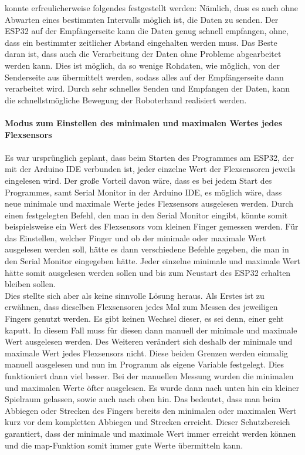 \documentclass[titlepage,12pt,twoside]{article}
\begin{document}
konnte erfreulicherweise folgendes festgestellt werden: Nämlich, dass es auch ohne 
Abwarten eines bestimmten Intervalls möglich ist, die Daten zu senden. Der ESP32 auf 
der Empfängerseite kann die Daten genug schnell empfangen, ohne, dass ein bestimmter 
zeitlicher Abstand eingehalten werden muss. Das Beste daran ist, dass auch die 
Verarbeitung der Daten ohne Probleme abgearbeitet werden kann. Dies ist möglich, da 
so wenige Rohdaten, wie möglich, von der Senderseite aus übermittelt werden, sodass 
alles auf der Empfängerseite dann verarbeitet wird. Durch sehr schnelles Senden und 
Empfangen der Daten, kann die schnellstmögliche Bewegung der Roboterhand realisiert werden. \\
\\
\textbf{Modus zum Einstellen des minimalen und maximalen Wertes jedes Flexsensors} \\
\\
Es war ursprünglich geplant, dass beim Starten des Programmes am ESP32, der mit der 
Arduino IDE verbunden ist, jeder einzelne Wert der Flexsensoren jeweils eingelesen 
wird. Der große Vorteil davon wäre, dass es bei jedem Start des Programmes, samt 
Serial Monitor in der Arduino IDE, es möglich wäre, dass neue minimale und maximale 
Werte jedes Flexsensors ausgelesen werden. Durch einen festgelegten Befehl, den man 
in den Serial Monitor eingibt, könnte somit beispielsweise ein Wert des Flexsensors 
vom kleinen Finger gemessen werden. Für das Einstellen, welcher Finger und ob der 
minimale oder maximale Wert ausgelesen werden soll, hätte es dann verschiedene 
Befehle gegeben, die man in den Serial Monitor eingegeben hätte. Jeder einzelne 
minimale und maximale Wert hätte somit ausgelesen werden sollen und bis zum Neustart 
des ESP32 erhalten bleiben sollen. \\
Dies stellte sich aber als keine sinnvolle Lösung heraus. Als Erstes ist zu erwähnen, 
dass dieselben Flexsensoren jedes Mal zum Messen des jeweiligen Fingers genutzt 
werden. Es gibt keinen Wechsel dieser, es sei denn, einer geht kaputt. In diesem 
Fall muss für diesen dann manuell der minimale und maximale Wert ausgelesen werden. 
Des Weiteren verändert sich deshalb der minimale und maximale Wert jedes Flexsensors 
nicht. Diese beiden Grenzen werden einmalig manuell ausgelesen und nun im Programm 
als eigene Variable festgelegt. Dies funktioniert dann viel besser. Bei der manuellen 
Messung wurden die minimalen und maximalen Werte öfter ausgelesen. Es wurde dann 
nach unten hin ein kleiner Spielraum gelassen, sowie auch nach oben hin. Das bedeutet, 
dass man beim Abbiegen oder Strecken des Fingers bereits den minimalen oder maximalen 
Wert kurz vor dem kompletten Abbiegen und Strecken erreicht. Dieser Schutzbereich 
garantiert, dass der minimale und maximale Wert immer erreicht werden können und die 
map-Funktion somit immer gute Werte übermitteln kann. \\
\\
\end{document}
